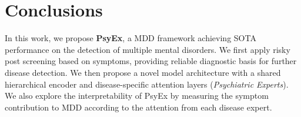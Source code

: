 \section{Conclusions}

In this work, we propose \textbf{PsyEx}, a MDD framework achieving SOTA performance on the detection of multiple mental disorders. We first apply risky post screening based on symptoms, providing reliable diagnostic basis for further disease detection. We then propose a novel model architecture with a shared hierarchical encoder and disease-specific attention layers (\textit{Psychiatric Experts}). We also explore the interpretability of PsyEx by measuring the symptom contribution to MDD according to the attention from each disease expert.
